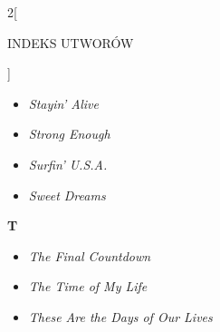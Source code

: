 \documentclass[a4paper]{report}
\begin{document}
\begin{multicols*}{2}[\begin{Huge}INDEKS UTWORÓW\end{Huge}\vspace{1cm}]
\begin{minipage}{\columnwidth}
\begin{itemize}[topsep=6pt, after=\vspace{1.5mm}, leftmargin=0mm]
		\itemsep0em
		\item[]  \textit{Stayin' Alive}  \\
	\end{itemize}
\end{minipage}
\begin{minipage}{\columnwidth}
	\begin{itemize}[topsep=6pt, after=\vspace{1.5mm}, leftmargin=0mm]
		\itemsep0em
		\item[]  \textit{Strong Enough}  \\
	\end{itemize}
\end{minipage}
\begin{minipage}{\columnwidth}
	\begin{itemize}[topsep=6pt, after=\vspace{5mm}, leftmargin=0mm]
		\itemsep0em
		\item[]  \textit{Surfin' U.S.A.}  \\
		\item[]  \textit{Sweet Dreams}  \\
	\end{itemize}
\end{minipage}
\begin{minipage}{\columnwidth}
\begin{Large}
		\textbf{T}
	\end{Large} 
	\begin{itemize}[topsep=6pt, after=\vspace{1.5mm}, leftmargin=0mm]
		\itemsep0em
		\item[]\textit{The Final Countdown}  \\
		\item[]  \textit{The Time of My Life}  \\
	\end{itemize}
\end{minipage}
\begin{minipage}{\columnwidth}
	\begin{itemize}[topsep=6pt, after=\vspace{1.5mm}, leftmargin=0mm]
		\itemsep0em
		\item[]  \textit{These Are the Days of Our Lives}  \\
	\end{itemize}
\end{minipage}
\begin{minipage}{\columnwidth}

\end{minipage}
\end{multicols*}
\end{document}
